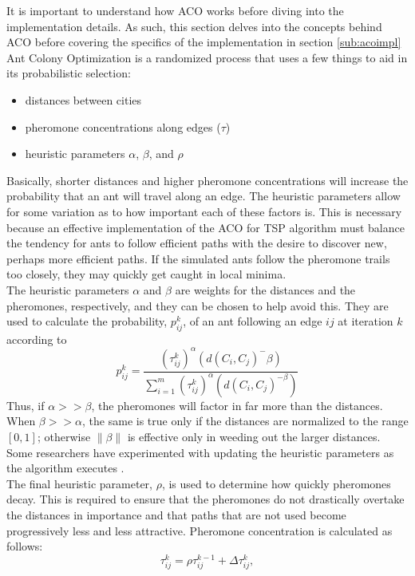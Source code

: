 \documentclass[twocolumn]{article}
\begin{document}
It is important to understand how ACO works before diving into 
the implementation details. As such, this section delves
into the concepts behind ACO before covering the
specifics of the implementation in section \ref{sub:acoimpl} \\

Ant Colony Optimization is a randomized process that uses a few things to aid
in its probabilistic selection:
\begin{itemize}
\item distances between cities
\item pheromone concentrations along edges ($\tau$)
\item heuristic parameters $\alpha$, $\beta$, and $\rho$
\end{itemize}
Basically, shorter distances and higher pheromone concentrations will
increase the probability that an ant will travel along an edge. The 
heuristic parameters allow for some variation as to how important 
each of these factors is. This is necessary because an effective 
implementation of the ACO for TSP algorithm must balance the tendency
for ants to follow efficient paths with the desire to discover new, 
perhaps more efficient paths. If the simulated ants follow the 
pheromone trails too closely, they may quickly get caught in local
minima. \\

The heuristic parameters $\alpha$ and $\beta$ are weights for the distances and 
the pheromones, respectively, and they can be chosen to help avoid this. They 
are used to calculate the probability, $p^k_{ij}$, of an ant following an edge
$ij$ at iteration $k$ according to 
\begin{equation}
p_{ij}^k = \frac{(\tau^k_{ij})^\alpha(d(C_i,C_j)^-\beta)}{\sum_{i=1}^m 
  (\tau^k_{ij})^\alpha(d(C_i,C_j)^{-\beta})} \label{eq:probs}
\end{equation}
Thus, if $\alpha >> \beta$, the pheromones will factor in far more than the
distances. When $\beta >> \alpha$, the same is true only if the distances are 
normalized to the range $[0,1]$; otherwise $\|\beta\|$ is effective only in 
weeding out the larger distances. Some researchers have experimented with 
updating the heuristic parameters as the algorithm executes \cite{ipcsit:aco}.\\

The final heuristic parameter, $\rho$, is used to 
determine how quickly pheromones decay. This is required to ensure that the pheromones do not
drastically overtake the distances in importance and that paths that are not used become 
progressively less and less attractive. Pheromone concentration is calculated as follows:
\begin{equation}
\tau^k_{ij} = \rho \tau^{k-1}_{ij} + \Delta \tau^k_{ij}, \label{eq:phers}
\end{equation}
\end{document}

